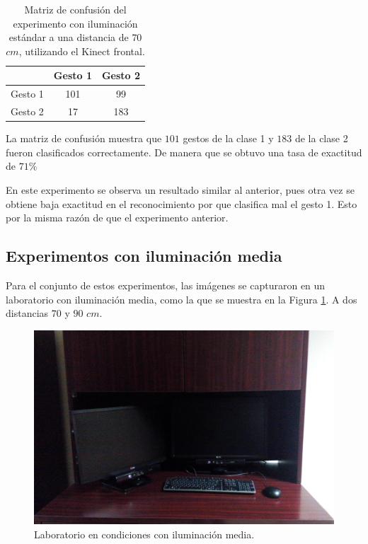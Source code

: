 \begin{itemize}
\begin{table}[h!] 
\begin{center}
\begin{tabular}{ r || c | c |} 
        & Gesto 1 & Gesto 2 \\ \hline \hline  
Gesto 1 &  101   & 99      \\ \hline  
Gesto 2 &  17    & 183     \\   
\end{tabular}
\end{center} 
\caption{Matriz de confusión del experimento con iluminación estándar a una distancia de $70$ $cm$, utilizando el Kinect frontal.}
\label{table:90LK1}
\end{table} 

La matriz de confusión muestra que $101$ gestos de la clase 1 y $183$ de la clase 2 fueron clasificados correctamente. De manera que se obtuvo una tasa de exactitud de $71 \%$  

\end{itemize}

En este experimento se observa un resultado similar al anterior, pues otra vez se obtiene baja exactitud en el reconocimiento por que clasifica mal el gesto 1. Esto por la misma razón de que el experimento anterior.



\subsection{Experimentos con iluminación media} 
Para el conjunto de estos experimentos, las imágenes se capturaron en un laboratorio con iluminación media, como la que se muestra en la Figura \ref{fig:LabMedioIluminado}. A dos distancias $70$ y $90$ $cm$.  

\begin{figure}[h!]
\begin{center} 
\includegraphics[scale=0.09]{./Figures/mediailuminacion.jpg}
\end{center}
\caption{Laboratorio en condiciones con iluminación media.}
\label{fig:LabMedioIluminado} 
\end{figure}  

